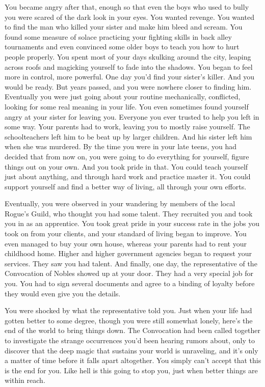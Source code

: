 \documentclass[char]{guildcamp3}
\begin{document}
You became angry after that, enough so that even the boys who used to bully you were scared of the dark look in your eyes. You wanted revenge. You wanted to find the man who killed your sister and make him bleed and scream. You found some measure of solace practicing your fighting skills in back alley tournaments and even convinced some older boys to teach you how to hurt people properly. You spent most of your days skulking around the city, leaping across roofs and magicking yourself to fade into the shadows. You began to feel more in control, more powerful. One day you'd find your sister's killer. And you would be ready. But years passed, and you were nowhere closer to finding him. Eventually you were just going about your routine mechanically, conflicted, looking for some real meaning in your life. You even sometimes found yourself angry at your sister for leaving you. Everyone you ever trusted to help you left in some way. Your parents had to work, leaving you to mostly raise yourself. The schoolteachers left him to be beat up by larger children. And his sister left him when she was murdered. By the time you were in your late teens, you had decided that from now on, you were going to do everything for yourself, figure things out on your own. And you took pride in that. You could teach yourself just about anything, and through hard work and practice master it. You could support yourself and find a better way of living, all through your own efforts.

Eventually, you were observed in your wandering by members of the local Rogue's Guild, who thought you had some talent. They recruited you and took you in as an apprentice. You took great pride in your success rate in the jobs you took on from your clients, and your standard of living began to improve. You even managed to buy your own house, whereas your parents had to rent your childhood home. Higher and higher government agencies began to request your services. They saw you had talent. And finally, one day, the representative of the Convocation of Nobles showed up at your door. They had a very special job for you. You had to sign several documents and agree to a binding of loyalty before they would even give you the details.

You were shocked by what the representative told you. Just when your life had gotten better to some degree, though you were still somewhat lonely, here's the end of the world to bring things down. The Convocation had been called together to investigate the strange occurrences you'd been hearing rumors about, only to discover that the deep magic that sustains your world is unraveling, and it's only a matter of time before it falls apart altogether. You simply can't accept that this is the end for you. Like hell is this going to stop you, just when better things are within reach. 
\end{document}
